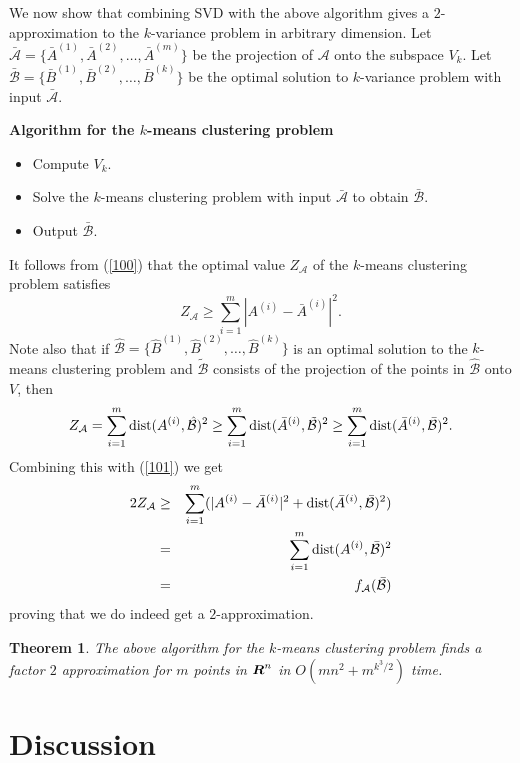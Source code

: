 \documentclass{book}
\newtheorem{theorem}{Theorem}[chapter]
\numberwithin{exercise}{chapter}
\begin{document}
We now show that combining SVD with the above algorithm gives a $2$-approximation to the $k$-variance problem in arbitrary dimension.
Let $\bar{{\mathcal A}}=\{\bar{A}^{(1)},\bar{A}^{(2)},\ldots,\bar{A}^{(m)}\}$ be the projection of ${\mathcal A}$
onto the subspace $V_{k}$. Let $\bar{{\mathcal B}}=\{\bar{B}^{(1)},\bar{B}^{(2)},\ldots,\bar{B}^{(k)}\}$
be the optimal solution to $k$-variance problem with input $\bar{{\mathcal A}}$.

{\bf Algorithm for the $k$-means clustering problem}
\begin{itemize}
\item Compute $V_{k}$.
\item Solve the $k$-means clustering problem
with input $\bar{{\mathcal A}}$ to obtain $\bar{{\mathcal B}}$.
\item Output $\bar{{\mathcal B}}$.
\end{itemize}
It follows from (\ref{100}) that the optimal value $Z_{{\mathcal A}}$
of the $k$-means clustering problem satisfies
\begin{equation}\label{101}
Z_{{\mathcal A}}\geq \sum_{i=1}^m|A^{(i)}-\bar{A}^{(i)}|^2.
\end{equation}
Note also that if $\hat{{\mathcal B}}=\{\hat{B}^{(1)},\hat{B}^{(2)},
 \ldots,\hat{B}^{(k)}\}$ is an optimal
solution to the $k$-means clustering problem
and $\tilde{{\mathcal B}}$ consists of the projection of the points in
$\hat{{\mathcal B}}$ onto $V$, then
$$
Z_{{\mathcal A}}= \sum_{i=1}^m\hbox{dist}(A^{(i)},\hat{{\mathcal B}})^2
\geq \sum_{i=1}^m\hbox{dist}(\bar{A}^{(i)},\tilde{{\mathcal B}})^2
\geq \sum_{i=1}^m\hbox{dist}(\bar{A}^{(i)},\bar{{\mathcal B}})^2.
$$
Combining this with (\ref{101}) we get
\begin{eqnarray*}
2Z_{{\mathcal A}} & \geq & \sum_{i=1}^m(|A^{(i)}-\bar{A}^{(i)}|^2+\hbox{dist}(\bar{A}^{(i)},\bar{{\mathcal B}})^2)\\
& = &\sum_{i=1}^m\hbox{dist}({A}^{(i)},\bar{{\mathcal B}})^2\\
& = &f_{{\mathcal A}}(\bar{{\mathcal B}})
\end{eqnarray*}
proving that we do indeed get a $2$-approximation.

\begin{theorem}
The above algorithm for the $k$-means clustering problem finds a factor $2$ approximation for $m$ points in $\mbox{\mbox{\boldmath $R$}}^n$ in $O(mn^2 + m^{k^3/2})$ time.
\end{theorem}

\section{Discussion}
\end{document}

